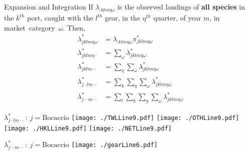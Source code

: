 \documentclass[ xcolor = pdftex, dvipsnames, table ]{beamer}
\begin{document}
%
%

%
\subsection{}
\begin{frame}{Expansion and Integration}
If $\lambda_{\cdot klm\eta\omega}$ is the observed landings of \textbf{all species} in the $k^{th}$ port, caught with the $l^{th}$ gear, in the $\eta^{th}$ quarter, of year $m$, in \mbox{market category $\omega$}. Then,
\begin{align*}
	\lambda^*_{jklm\eta\omega} &=\lambda_{\cdot k l m \eta \omega}\pi^*_{jklm\eta\omega}\\[10pt]
	\lambda^*_{jklm\eta\cdot} &=\sum_{\omega}\lambda^*_{jklm\eta\omega}\\
	\lambda^*_{jklm\cdot\cdot} &=\sum_{\eta}\sum_{\omega}\lambda^*_{jklm\eta\omega}\\
	\lambda^*_{j\cdot lm\cdot\cdot} &=\sum_{k}\sum_{\eta}\sum_{\omega}\lambda^*_{jklm\eta\omega}\\
	\lambda^*_{j\cdot\cdot m\cdot\cdot} &=\sum_{l}\sum_{k}\sum_{\eta}\sum_{\omega}\lambda^*_{jklm\eta\omega}
\end{align*}
\end{frame}



%
%

%
\begin{frame}{$\lambda^*_{j\cdot lm\cdot\cdot}~:~j=\text{Bocaccio}$ }%
	\hspace*{-0.6cm}  %
	\texttt{[image: ./TWLLine9.pdf]}
	\texttt{[image: ./OTHLine9.pdf]}\\
	\hspace*{-0.6cm}
	\texttt{[image: ./HKLLine9.pdf]}
	\texttt{[image: ./NETLine9.pdf]}	
\end{frame}

%
%

%
\begin{frame}{$\lambda^*_{j\cdot\cdot m\cdot\cdot}~:~j=\text{Bocaccio}$}%
	\vspace{-0.5cm}
	\hspace*{-1cm}
	\texttt{[image: ./gearLine6.pdf]}
\end{frame}
\end{document}
